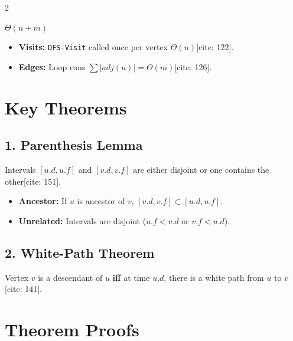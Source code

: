 \documentclass[a4paper,10pt]{article}
\begin{document}
\begin{multicols*}{2}
\begin{tcolorbox}[colback=yellow!10!white, colframe=red!75!black, title=\textbf{TIME COMPLEXITY}]
    \begin{center}
        \Large \boldmath $\Theta(n + m)$
    \end{center}
    \begin{itemize}[leftmargin=*]
        \item \textbf{Visits:} \texttt{DFS-Visit} called once per vertex $\Theta(n)$[cite: 122].
        \item \textbf{Edges:} Loop runs $\sum |adj(u)| = \Theta(m)$[cite: 126].
    \end{itemize}
\end{tcolorbox}

\section{Key Theorems}

\subsection*{1. Parenthesis Lemma}
Intervals $[u.d, u.f]$ and $[v.d, v.f]$ are either disjoint or one contains the other[cite: 151].
\begin{itemize}[leftmargin=*]
    \item \textbf{Ancestor:} If $u$ is ancestor of $v$, $[v.d, v.f] \subset [u.d, u.f]$.
    \item \textbf{Unrelated:} Intervals are disjoint ($u.f < v.d$ or $v.f < u.d$).
\end{itemize}

\subsection*{2. White-Path Theorem}
Vertex $v$ is a descendant of $u$ \textbf{iff} at time $u.d$, there is a white path from $u$ to $v$[cite: 141].

\section{Theorem Proofs}


\end{multicols*}
\end{document}
